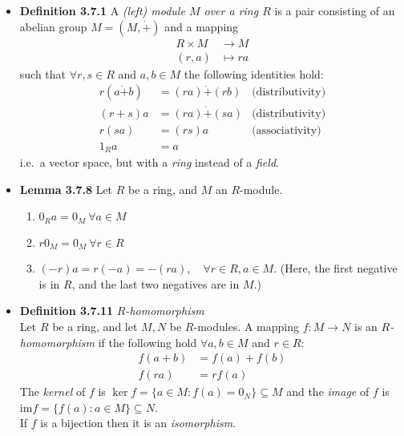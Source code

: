 \documentclass[11pt,a4paper]{article}
\begin{document}
\begin{itemize}

    \item \textbf{Definition 3.7.1}
        A \emph{(left) module $M$ over a ring $R$} is a pair consisting of an abelian group
        $M = (M, \dot{+})$ and a mapping
        \begin{align*}{}
            R \times M & \to M \\
            (r,a)      & \mapsto ra
        \end{align*}
        such that $\forall r,s \in R$ and $a,b \in M$ the following identities hold:
        \begin{align*}{}
            r(a \dot{+} b) & = (ra) \dot{+} (rb) & \text{(distributivity)} \\
            (r+s)a         & = (ra) \dot{+} (sa) & \text{(distributivity)}\\
            r(sa)          & = (rs)a             & \text{(associativity)}\\
            {1_R}a         & = a
        \end{align*}
        i.e.\ a vector space, but with a \emph{ring} instead of a \emph{field}.

    \item \textbf{Lemma 3.7.8} Let $R$ be a ring, and $M$ an $R$-module.
        \begin{enumerate}
            \item ${0_R}a = 0_M \ \forall a \in M$
            \item $r{0_M} = 0_M \ \forall r \in R$
            \item $(-r)a = r(-a) = -(ra), \quad \forall r \in R, a \in M$.
                (Here, the first negative is in $R$, and the last two negatives are in $M$.)
        \end{enumerate}

    \item \textbf{Definition 3.7.11} \emph{$R$-homomorphism} \\
        Let $R$ be a ring, and let $M,N$ be $R$-modules.
        A mapping $f : M \to N$ is an \emph{$R$-homomorphism} if the following hold
        $\forall a,b \in M$ and $r \in R$:
        \begin{align*}{}
            f(a+b) & = f(a) + f(b) \\
            f(ra)  & = rf(a)
        \end{align*}
        The \emph{kernel} of $f$ is $\ker f = \{a\in M : f(a) = 0_N \} \subseteq M$
        and the \emph{image} of $f$ is $\mathrm{im} f = \{f(a) : a \in M\} \subseteq N$. \\
        If $f$ is a bijection then it is an \emph{isomorphism}.


\end{itemize}
\end{document}
